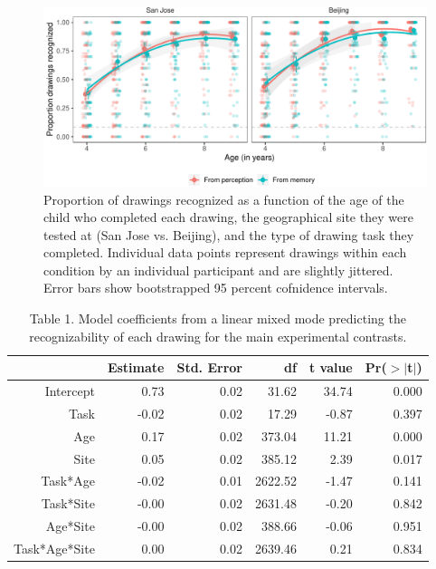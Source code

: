 \documentclass[
  english,
  man]{apa6}
\begin{document}
\begin{figure}[H]

{\centering \includegraphics[width=\textwidth]{Manuscript_June2021_files/figure-latex/main-results-1} 

}

\caption{Proportion of drawings recognized as a function of the age of the child who completed each drawing, the geographical site they were tested at (San Jose vs. Beijing), and the type of drawing task they completed. Individual data points represent drawings within each condition by an individual participant and are slightly jittered. Error bars show bootstrapped 95 percent cofnidence intervals.}\label{fig:main-results}
\end{figure}

\begin{table}[ht]
\centering
\begin{tabular}{rrrrrr}
  \hline
 & Estimate & Std. Error & df & t value & Pr($>$$|$t$|$) \\
  \hline
Intercept & 0.73 & 0.02 & 31.62 & 34.74 & 0.000 \\
  Task & -0.02 & 0.02 & 17.29 & -0.87 & 0.397 \\
  Age & 0.17 & 0.02 & 373.04 & 11.21 & 0.000 \\
  Site & 0.05 & 0.02 & 385.12 & 2.39 & 0.017 \\
  Task*Age & -0.02 & 0.01 & 2622.52 & -1.47 & 0.141 \\
  Task*Site & -0.00 & 0.02 & 2631.48 & -0.20 & 0.842 \\
  Age*Site & -0.00 & 0.02 & 388.66 & -0.06 & 0.951 \\
  Task*Age*Site & 0.00 & 0.02 & 2639.46 & 0.21 & 0.834 \\
   \hline
\end{tabular}
\caption{Table 1. Model coefficients from a linear mixed mode predicting the recognizability of each drawing for the main experimental contrasts.}
\end{table}
\end{document}
